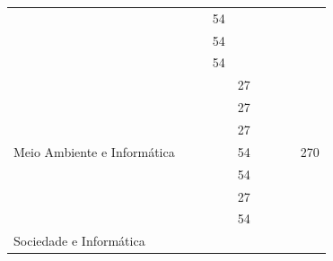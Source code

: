 \documentclass[11pt,fleqn]{book} %
\begin{document}
\begin{table}[]
{\begin{tabular}{|l|l|c|c|c|c|c|c|c|}
			& \nameref{2_arqsoft}                                           &                 & 54              &                 &                 &                 &                 &                      \\ \cline{2-8}
			& \nameref{2_estruturadedados}                                  &                 & 54              &                 &                 &                 &                 &                      \\ \cline{2-8}
			& \nameref{2_algebra}                                           &                 & 54              &                 &                 &                 &                 &                      \\ \hline
			\multirow{7}{*}{Meio Ambiente e Informática}                     
			& \nameref{3_poo}                                               &                 &                 & 27              &                 &                 &                 & \multirow{7}{*}{270} \\ \cline{2-8}
			& \nameref{3_nosql}                                             &                 &                 & 27              &                 &                 &                 &                      \\ \cline{2-8}			
			& \nameref{3_testsoft}                                          &                 &                 & 27              &                 &                 &                 &                      \\ \cline{2-8}
			& \nameref{3_engreq}                                            &                 &                 & 54              &                 &                 &                 &                      \\ \cline{2-8}
			& \nameref{3_redescomp}                                         &                 &                 & 54              &                 &                 &                 &                      \\ \cline{2-8}
			& \nameref{3_educamb}                                           &                 &                 & 27              &                 &                 &                 &                      \\ \cline{2-8}
			&\nameref{3_projamb}                                            &                 &                 & 54              &                 &                 &                 &                      \\ \hline
			\multirow{5}{*}{Sociedade e Informática}                         

\end{tabular}}
\end{table}
\end{document}
